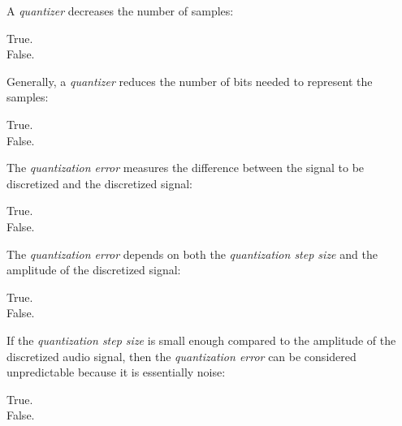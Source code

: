 \documentclass[legalpaper, 12pt, addpoints]{exam}
\begin{document}
\begin{questions}
\vspace{0.10in}

\question A \emph{quantizer} decreases the number of samples:

\begin{oneparchoices}
  \choice True.\\
  \choice False.
\end{oneparchoices}
  
\vspace{0.10in}

\question Generally, a \emph{quantizer} reduces the number of bits needed to represent the samples:

\begin{oneparchoices}
  \choice True.\\
  \choice False.
\end{oneparchoices}
  
\vspace{0.10in}

\question The \emph{quantization error} measures the difference between the signal to be discretized and the discretized signal:

\begin{oneparchoices}
  \choice True.\\
  \choice False.
\end{oneparchoices}
  
\vspace{0.10in}

\question The \emph{quantization error} depends on both the \emph{quantization step size} and the amplitude of the discretized signal:

\begin{oneparchoices}
  \choice True.\\
  \choice False.
\end{oneparchoices}
  
\vspace{0.10in}

\question If the \emph{quantization step size} is small enough compared to the amplitude of the discretized audio signal, then the \emph{quantization error} can be considered unpredictable because it is essentially noise:

\begin{oneparchoices}
  \choice True.\\
  \choice False.
\end{oneparchoices}
  
\vspace{0.10in}


\end{questions}
\end{document}
